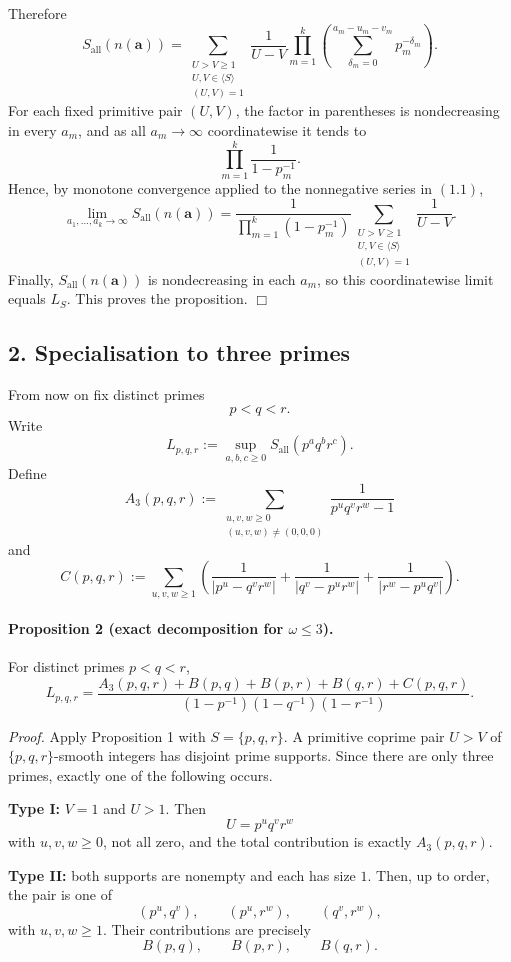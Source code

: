 Therefore
\[
S_{\mathrm{all}}(n(\mathbf a))
=
\sum_{\substack{U>V\ge 1\\ U,V\in \langle S\rangle\\ (U,V)=1}}
\frac{1}{U-V}
\prod_{m=1}^k
\left(
\sum_{\delta_m=0}^{a_m-u_m-v_m} p_m^{-\delta_m}
\right).
\tag{1.1}
\]
For each fixed primitive pair \((U,V)\), the factor in parentheses is nondecreasing in every \(a_m\), and as all \(a_m\to\infty\) coordinatewise it tends to
\[
\prod_{m=1}^k \frac{1}{1-p_m^{-1}}.
\]
Hence, by monotone convergence applied to the nonnegative series in \((1.1)\),
\[
\lim_{a_1,\dots,a_k\to\infty} S_{\mathrm{all}}(n(\mathbf a))
=
\frac{1}{\prod_{m=1}^k(1-p_m^{-1})}
\sum_{\substack{U>V\ge 1\\ U,V\in \langle S\rangle\\ (U,V)=1}}
\frac{1}{U-V}.
\]
Finally, \(S_{\mathrm{all}}(n(\mathbf a))\) is nondecreasing in each \(a_m\), so this coordinatewise limit equals \(L_S\). This proves the proposition.
\hfill\(\Box\)

\subsection*{2. Specialisation to three primes}

From now on fix distinct primes
\[
p<q<r.
\]
Write
\[
L_{p,q,r}:=\sup_{a,b,c\ge 0}S_{\mathrm{all}}(p^a q^b r^c).
\]
Define
\[
A_3(p,q,r):=
\sum_{\substack{u,v,w\ge 0\\(u,v,w)\neq (0,0,0)}}
\frac{1}{p^u q^v r^w-1}
\]
and
\[
C(p,q,r):=
\sum_{u,v,w\ge 1}
\left(
\frac{1}{|p^u-q^v r^w|}
+\frac{1}{|q^v-p^u r^w|}
+\frac{1}{|r^w-p^u q^v|}
\right).
\]

\paragraph{Proposition 2 (exact decomposition for \(\omega\le 3\)).}
For distinct primes \(p<q<r\),
\[
L_{p,q,r}
=
\frac{
A_3(p,q,r)+B(p,q)+B(p,r)+B(q,r)+C(p,q,r)
}{
(1-p^{-1})(1-q^{-1})(1-r^{-1})
}.
\]

\emph{Proof.}
Apply Proposition 1 with \(S=\{p,q,r\}\). A primitive coprime pair \(U>V\) of \(\{p,q,r\}\)-smooth integers has disjoint prime supports. Since there are only three primes, exactly one of the following occurs.

\medskip
\noindent\textbf{Type I:} \(V=1\) and \(U>1\).  
Then
\[
U=p^u q^v r^w
\]
with \(u,v,w\ge 0\), not all zero, and the total contribution is exactly \(A_3(p,q,r)\).

\medskip
\noindent\textbf{Type II:} both supports are nonempty and each has size \(1\).  
Then, up to order, the pair is one of
\[
(p^u,q^v),\qquad (p^u,r^w),\qquad (q^v,r^w),
\]
with \(u,v,w\ge 1\). Their contributions are precisely
\[
B(p,q),\qquad B(p,r),\qquad B(q,r).
\]

